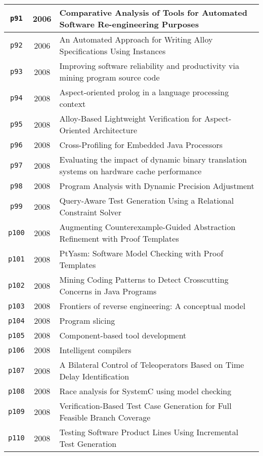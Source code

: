 \begin{longtable}{| c | c | p{16cm} |}
  \texttt{p91} & 2006 & Comparative Analysis of Tools for Automated Software Re-engineering Purposes \\
  \hline
  \texttt{p92} & 2006 & An Automated Approach for Writing Alloy Specifications Using Instances \\
  \hline
  \texttt{p93} & 2008 & Improving software reliability and productivity via mining program source code \\
  \hline
  \texttt{p94} & 2008 & Aspect-oriented prolog in a language processing context \\
  \hline
  \texttt{p95} & 2008 & Alloy-Based Lightweight Verification for Aspect-Oriented Architecture \\
  \hline
  \texttt{p96} & 2008 & Cross-Profiling for Embedded Java Processors \\
  \hline
  \texttt{p97} & 2008 & Evaluating the impact of dynamic binary translation systems on hardware cache performance \\
  \hline
  \texttt{p98} & 2008 & Program Analysis with Dynamic Precision Adjustment \\
  \hline
  \texttt{p99} & 2008 & Query-Aware Test Generation Using a Relational Constraint Solver \\
  \hline
  \texttt{p100} & 2008 & Augmenting Counterexample-Guided Abstraction Refinement with Proof Templates \\
  \hline
  \texttt{p101} & 2008 & PtYasm: Software Model Checking with Proof Templates \\
  \hline
  \texttt{p102} & 2008 & Mining Coding Patterns to Detect Crosscutting Concerns in Java Programs \\
  \hline
  \texttt{p103} & 2008 & Frontiers of reverse engineering: A conceptual model \\
  \hline
  \texttt{p104} & 2008 & Program slicing \\
  \hline
  \texttt{p105} & 2008 & Component-based tool development \\
  \hline
  \texttt{p106} & 2008 & Intelligent compilers \\
  \hline
  \texttt{p107} & 2008 & A Bilateral Control of Teleoperators Based on Time Delay Identification \\
  \hline
  \texttt{p108} & 2008 & Race analysis for SystemC using model checking \\
  \hline
  \texttt{p109} & 2008 & Verification-Based Test Case Generation for Full Feasible Branch Coverage \\
  \hline
  \texttt{p110} & 2008 & Testing Software Product Lines Using Incremental Test Generation \\

\end{longtable}

